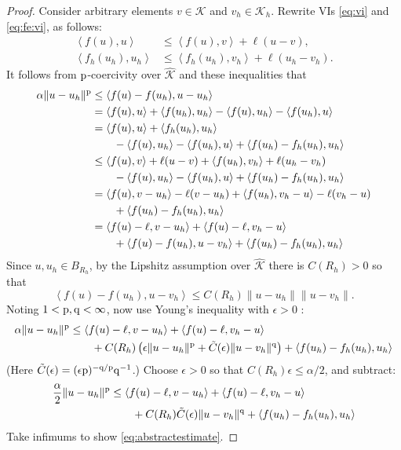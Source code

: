 \documentclass[hidelinks,onefignum,onetabnum,final]{siamart220329}  %
\newcommand{\eps}{\epsilon}
\newcommand{\cK}{\mathcal{K}}
\newcommand{\hcK}{\widehat{\cK}}
\newcommand{\pp}{{\text{\textnormal{p}}}}
\newcommand{\qq}{{\text{\textnormal{q}}}}
\newcommand{\ip}[2]{\left<#1,#2\right>}
\begin{document}
\begin{proof}  Consider arbitrary elements $v\in\cK$ and $v_h\in\cK_h$.  Rewrite VIs \eqref{eq:vi} and \eqref{eq:fe:vi}, as follows:
\begin{align*}
\ip{f(u)}{u}     &\le \ip{f(u)}{v} + \ell(u-v),  \\
\ip{f_h(u_h)}{u_h} &\le \ip{f_h(u_h)}{v_h} + \ell(u_h-v_h).
\end{align*}
It follows from $\pp$-coercivity over $\hcK$ and these inequalities that
\begin{align*}
\alpha \|u-u_h\|^\pp &\le \ip{f(u)-f(u_h)}{u-u_h} \\
  &= \ip{f(u)}{u} + \ip{f(u_h)}{u_h} - \ip{f(u)}{u_h} - \ip{f(u_h)}{u} \\
  &= \ip{f(u)}{u} + \ip{f_h(u_h)}{u_h} \\
  &\qquad - \ip{f(u)}{u_h} - \ip{f(u_h)}{u} + \ip{f(u_h)-f_h(u_h)}{u_h} \\
  &\le \ip{f(u)}{v} + \ell(u-v) + \ip{f(u_h)}{v_h} + \ell(u_h-v_h) \\
  &\qquad - \ip{f(u)}{u_h} - \ip{f(u_h)}{u} + \ip{f(u_h)-f_h(u_h)}{u_h} \\
  &= \ip{f(u)}{v-u_h} - \ell(v-u_h) + \ip{f(u_h)}{v_h-u} - \ell(v_h-u) \\
  &\qquad + \ip{f(u_h)-f_h(u_h)}{u_h} \\
  &= \ip{f(u)-\ell}{v-u_h} + \ip{f(u)-\ell}{v_h-u} \\
  &\qquad + \ip{f(u)-f(u_h)}{u-v_h} + \ip{f(u_h)-f_h(u_h)}{u_h}
\end{align*}
Since $u,u_h\in B_{R_h}$, by the Lipshitz assumption over $\hcK$ there is $C(R_h)>0$ so that
    $$\ip{f(u)-f(u_h)}{u-v_h} \le C(R_h) \|u-u_h\|\|u-v_h\|.$$
Noting $1<\pp,\qq<\infty$, now use Young's inequality with $\eps>0$ \cite[Appendix B.2]{Evans2010}:
\begin{align*}
\alpha \|u-u_h\|^\pp &\le \ip{f(u)-\ell}{v-u_h} + \ip{f(u)-\ell}{v_h-u} \\
  &\qquad + C(R_h) \left(\eps\|u-u_h\|^\pp + \tilde C(\eps) \|u-v_h\|^\qq\right) + \ip{f(u_h)-f_h(u_h)}{u_h}
\end{align*}
(Here $\tilde C(\eps) = (\eps \pp)^{-\qq/\pp} \qq^{-1}$.)  Choose $\eps>0$ so that $C(R_h) \eps \le \alpha/2$, and subtract:
\begin{align*}
\frac{\alpha}{2} \|u-u_h\|^\pp &\le \ip{f(u)-\ell}{v-u_h} + \ip{f(u)-\ell}{v_h-u} \\
  &\qquad + C(R_h) \tilde C(\eps) \|u-v_h\|^\qq + \ip{f(u_h)-f_h(u_h)}{u_h}
\end{align*}
Take infimums to show \eqref{eq:abstractestimate}.
\end{proof}
\end{document}

